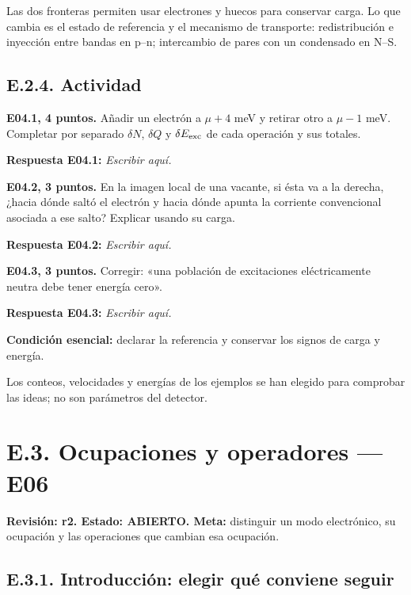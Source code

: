 \documentclass[
  spanish,
  10pt,
  a4paper,
]{article}
\begin{document}
Las dos fronteras permiten usar electrones y huecos para conservar
carga. Lo que cambia es el estado de referencia y el mecanismo de
transporte: redistribución e inyección entre bandas en p--n; intercambio
de pares con un condensado en N--S.

\subsection{E.2.4. Actividad}\label{e.2.4.-actividad}


\textbf{E04.1, 4 puntos.} Añadir un electrón a \(\mu+4\) meV y retirar
otro a \(\mu-1\) meV. Completar por separado \(\delta N\), \(\delta Q\)
y \(\delta E_{\rm exc}\) de cada operación y sus totales.

\textbf{Respuesta E04.1:} \emph{Escribir aquí.}


\textbf{E04.2, 3 puntos.} En la imagen local de una vacante, si ésta va
a la derecha, ¿hacia dónde saltó el electrón y hacia dónde apunta la
corriente convencional asociada a ese salto? Explicar usando su carga.

\textbf{Respuesta E04.2:} \emph{Escribir aquí.}


\textbf{E04.3, 3 puntos.} Corregir: «una población de excitaciones
eléctricamente neutra debe tener energía cero».

\textbf{Respuesta E04.3:} \emph{Escribir aquí.}

\textbf{Condición esencial:} declarar la referencia y conservar los
signos de carga y energía.

Los conteos, velocidades y energías de los ejemplos se han elegido para
comprobar las ideas; no son parámetros del detector.


\bigskip

\section{E.3. Ocupaciones y operadores ---
E06}\label{e.3.-ocupaciones-y-operadores-e06}

\textbf{Revisión: r2. Estado: ABIERTO. Meta:} distinguir un modo
electrónico, su ocupación y las operaciones que cambian esa ocupación.

\subsection{E.3.1. Introducción: elegir qué conviene
seguir}\label{e.3.1.-introducciuxf3n-elegir-quuxe9-conviene-seguir}
\end{document}
